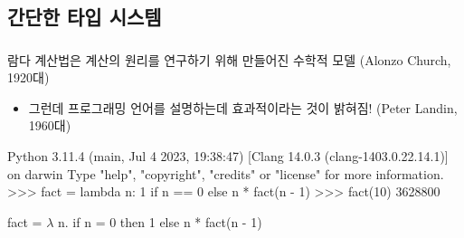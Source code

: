 \documentclass{beamer}
\begin{document}
\subsection{간단한 타입 시스템}
\begin{frame}[c, fragile]
  \frametitle{}

  람다 계산법은 계산의 원리를 연구하기 위해 만들어진 수학적 모델 (Alonzo Church, 1920대)
  \begin{itemize}
    \item 그런데 프로그래밍 언어를 설명하는데 효과적이라는 것이 밝혀짐! (Peter Landin, 1960대)
  \end{itemize}

  \pause\begin{pycode}
Python 3.11.4 (main, Jul  4 2023, 19:38:47) [Clang 14.0.3 (clang-1403.0.22.14.1)] on darwin
Type "help", "copyright", "credits" or "license" for more information.
>>> fact = lambda n: 1 if n == 0 else n * fact(n - 1)
>>> fact(10)
3628800
  \end{pycode}
  \pause
  \begin{center}
    fact = $\lambda$ n. if n = 0 then 1 else n * fact(n - 1)
  \end{center}
\end{frame}
\end{document}
